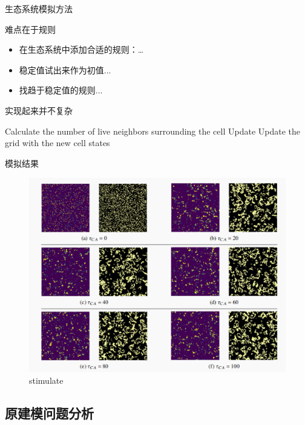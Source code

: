 \documentclass{beamer}
\begin{document}
\begin{frame}{生态系统模拟方法}
\begin{block}{难点在于规则}
    \begin{itemize}
        \item 在生态系统中添加合适的规则：…
        \item 稳定值试出来作为初值...
        \item 找趋于稳定值的规则...
    \end{itemize}    
\end{block}
\begin{block}{实现起来并不复杂}
    \begin{tcolorbox}[colback=white,colframe=black!50!white]
    \begin{algorithmic}
            \STATE Calculate the number of live neighbors surrounding the cell
            \STATE Update 
        \ENDFOR
        \STATE Update the grid with the new cell states
    \end{algorithmic}
    \end{tcolorbox}
    
\end{block}

\end{frame}

\begin{frame}{模拟结果}
    \begin{figure}[htpb]
        \centering
        \includegraphics[width=0.6\linewidth]{./pic/stimulate.png}
        \caption{stimulate}
    \end{figure}
\end{frame}







\subsection{原建模问题分析}
\end{document}
